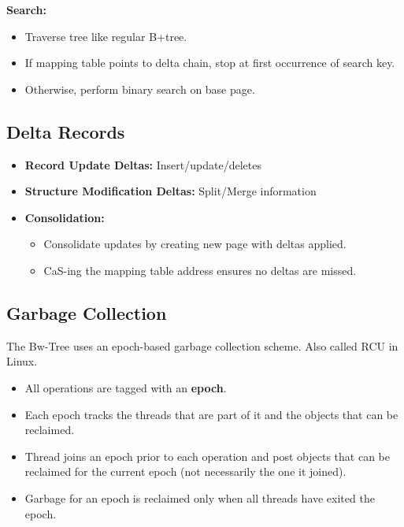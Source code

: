 \documentclass[11pt]{article}
\begin{document}
\textbf{Search:}
\begin{itemize}
    \item
    Traverse tree like regular B+tree.
    
    \item
    If mapping table points to delta chain, stop at first occurrence of search key.
    
    \item
    Otherwise, perform binary search on base page.
\end{itemize}

\subsection*{Delta Records}
\begin{itemize}
    \item \textbf{Record Update Deltas:}
    Insert/update/deletes
    
    \item \textbf{Structure Modification Deltas:}
    Split/Merge information
    
    \item \textbf{Consolidation:}
    \begin{itemize}
        \item
        Consolidate updates by creating new page with deltas applied.
        
        \item
        CaS-ing the mapping table address ensures no deltas are missed.
    \end{itemize}
\end{itemize}

\subsection*{Garbage Collection}
The Bw-Tree uses an epoch-based garbage collection scheme. Also called RCU in Linux.

\begin{itemize}
    \item
    All operations are tagged with an \textbf{epoch}.
    
    \item
    Each epoch tracks the threads that are part of it and the objects that can be reclaimed.
    
    \item
    Thread joins an epoch prior to each operation and post objects that can be reclaimed for 
    the current epoch (not necessarily the one it joined).
    
    \item
    Garbage for an epoch is reclaimed only when all threads have exited the epoch.
\end{itemize}

\newpage


\end{document}
